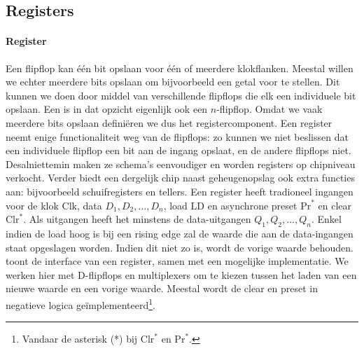 \subsection{Registers}
\label{ss:registers}
\paragraph{Register}Een flipflop kan \'e\'en bit opslaan voor \'e\'en of meerdere klokflanken. Meestal willen we echter meerdere bits opslaan om bijvoorbeeld een getal voor te stellen. Dit kunnen we doen door middel van verschillende flipflops die elk een individuele bit opslaan. Een  is in dat opzicht eigenlijk ook een $n$-flipflop. Omdat we vaak meerdere bits opslaan defini\"eren we dus het registercomponent. Een register neemt enige functionaliteit weg van de flipflops: zo kunnen we niet beslissen dat een individuele flipflop een bit aan de ingang opslaat, en de andere flipflops niet. Desalniettemin maken ze schema's eenvoudiger en worden registers op chipniveau verkocht. Verder biedt een dergelijk chip naast geheugenopslag ook extra functies aan: bijvoorbeeld schuifregisters en tellers. Een register heeft tradioneel ingangen voor de klok $\mbox{Clk}$, data $D_1, D_2,\ldots, D_n$, load $\mbox{LD}$ en asynchrone preset $\mbox{Pr}^*$ en clear $\mbox{Clr}^*$. Als uitgangen heeft het minstens de data-uitgangen $Q_1, Q_2, \ldots, Q_n$. Enkel indien de load hoog is bij een rising edge zal de waarde die aan de data-ingangen staat opgeslagen worden. Indien dit niet zo is, wordt de vorige waarde behouden.  toont de interface van een register, samen met een mogelijke implementatie. We werken hier met D-flipflops en multiplexers om te kiezen tussen het laden van een nieuwe waarde en een vorige waarde. Meestal wordt de clear en preset in negatieve logica ge\"implementeerd\footnote{Vandaar de asterisk (*) bij $\mbox{Clr}^*$ en $\mbox{Pr}^*$.}.

